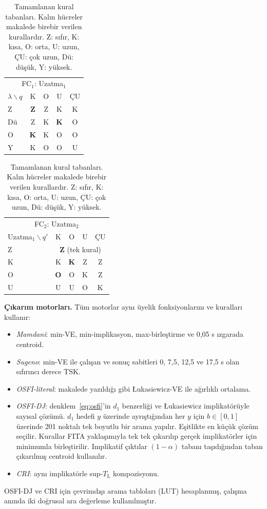 \documentclass[11pt,a4paper]{article}
\theoremstyle{definition}
\newcommand{\Luk}{\mathrm{L}}
\begin{document}
\begin{table}[t]
\centering
\caption{Tamamlanan kural tabanları. Kalın hücreler makalede birebir verilen kurallardır. Z: sıfır, K: kısa, O: orta, U: uzun, ÇU: çok uzun, Dü: düşük, Y: yüksek.}
\label{tab:rules}
\small
\begin{tabular}{@{}l|cccc@{}}
\toprule
\multicolumn{5}{c}{FC$_1$: Uzatma$_1$} \\
$\lambda\backslash q$ & K & O & U & ÇU \\
\midrule
Z & \textbf{Z} & Z & K & K \\
Dü & Z & K & \textbf{K} & O \\
O & \textbf{K} & K & O & O \\
Y & K & O & O & U \\
\bottomrule
\end{tabular}
\qquad
\begin{tabular}{@{}l|cccc@{}}
\toprule
\multicolumn{5}{c}{FC$_2$: Uzatma$_2$} \\
Uzatma$_1\backslash q'$ & K & O & U & ÇU \\
\midrule
Z & \multicolumn{4}{c}{\textbf{Z} (tek kural)} \\
K & K & \textbf{K} & Z & Z \\
O & \textbf{O} & O & K & Z \\
U & U & U & O & K \\
\bottomrule
\end{tabular}
\end{table}

\textbf{Çıkarım motorları.} Tüm motorlar aynı üyelik fonksiyonlarını ve kuralları kullanır:
\begin{itemize}
\item \emph{Mamdani}: min-VE, min-implikasyon, max-birleştirme ve 0,05 s ızgarada centroid.
\item \emph{Sugeno}: min-VE ile çalışan ve sonuç sabitleri 0, 7,5, 12,5 ve 17,5 s olan sıfırıncı derece TSK.
\item \emph{OSFI-literal}: makalede yazıldığı gibi Łukasiewicz-VE ile ağırlıklı ortalama.
\item \emph{OSFI-DJ}: denklem~\eqref{eq:osfi}'in $d_1$ benzerliği ve Łukasiewicz implikatörüyle sayısal çözümü. $d_1$ hedefi $y$ üzerinde ayrıştığından her $y$ için $b\in[0,1]$ üzerinde 201 noktalı tek boyutlu bir arama yapılır. Eşitlikte en küçük çözüm seçilir. Kurallar FITA yaklaşımıyla tek tek çıkarılıp gerçek implikatörler için minimumla birleştirilir. Implikatif çıktılar $(1-\alpha)$ tabanı taşıdığından taban çıkarılmış centroid kullanılır.
\item \emph{CRI}: aynı implikatörle sup-$T_\Luk$ kompozisyonu.
\end{itemize}
OSFI-DJ ve CRI için çevrimdışı arama tabloları (LUT) hesaplanmış, çalışma anında iki doğrusal ara değerleme kullanılmıştır.
\end{document}
